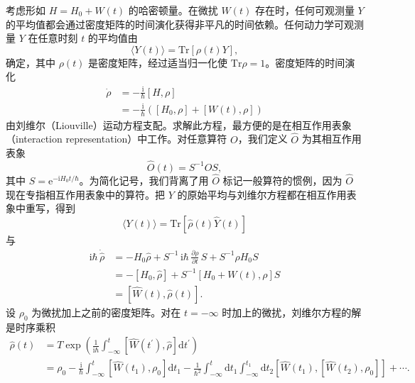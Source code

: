 考虑形如 $H=H_0+W(t)$ 的哈密顿量。在微扰 $W(t)$ 存在时，任何可观测量 $Y$ 的平均值都会通过密度矩阵的时间演化获得非平凡的时间依赖。任何动力学可观测量 $Y$ 在任意时刻 $t$ 的平均值由
\begin{equation*}
\langle Y(t)\rangle=\mathrm{Tr}[\rho(t)Y],\tag{9.43}
\end{equation*}
确定，其中 $\rho(t)$ 是密度矩阵，经过适当归一化使 $\mathrm{Tr}\rho=1$。密度矩阵的时间演化
\begin{equation*}
\begin{aligned}
\dot{\rho}&=-\frac{\mathrm{i}}{\hbar}[H,\rho]\\
&=-\frac{\mathrm{i}}{\hbar}\left([H_0,\rho]+[W(t),\rho]\right)
\end{aligned}\tag{9.44}
\end{equation*}
由刘维尔（Liouville）运动方程支配。求解此方程，最方便的是在相互作用表象（interaction representation）中工作。对任意算符 $O$，我们定义 $\widehat{O}$ 为其相互作用表象
\begin{equation*}
\widehat{O}(t)=S^{-1}OS,\tag{9.45}
\end{equation*}
其中 $S=\mathrm{e}^{-\mathrm{i}H_0t/\hbar}$。为简化记号，我们背离了用 $\widehat{O}$ 标记一般算符的惯例，因为 $\widehat{O}$ 现在专指相互作用表象中的算符。把 $Y$ 的原始平均与刘维尔方程都在相互作用表象中重写，得到
\begin{equation*}
\langle Y(t)\rangle=\mathrm{Tr}[\widehat{\rho}(t)\widehat{Y}(t)]\tag{9.46}
\end{equation*}
与
\begin{equation*}
\begin{aligned}
\mathrm{i}\hbar\,\dot{\widehat{\rho}}&=-H_0\widehat{\rho}+S^{-1}\,\mathrm{i}\hbar\,\frac{\partial\rho}{\partial t}\,S+S^{-1}\rho H_0 S\\
&=-[H_0,\widehat{\rho}]+S^{-1}[H_0+W(t),\rho]S\\
&=[\widehat{W}(t),\widehat{\rho}(t)].
\end{aligned}\tag{9.47}
\end{equation*}
设 $\rho_0$ 为微扰加上之前的密度矩阵。对在 $t=-\infty$ 时加上的微扰，刘维尔方程的解是时序乘积
\begin{equation*}
\begin{aligned}
\widehat{\rho}(t)&=T\exp\left(\frac{1}{\mathrm{i}\hbar}\int_{-\infty}^{t}\left[\widehat{W}(t^{\prime}),\widehat{\rho}\right]\mathrm{d}t^{\prime}\right)\\
&=\rho_0-\frac{\mathrm{i}}{\hbar}\int_{-\infty}^{t}\left[\widehat{W}(t_1),\rho_0\right]\mathrm{d}t_1-\frac{1}{\hbar^2}\int_{-\infty}^{t}\mathrm{d}t_1\int_{-\infty}^{t_1}\mathrm{d}t_2\left[\widehat{W}(t_1),\left[\widehat{W}(t_2),\rho_0\right]\right]+\cdots.
\end{aligned}\tag{9.48}
\end{equation*}
